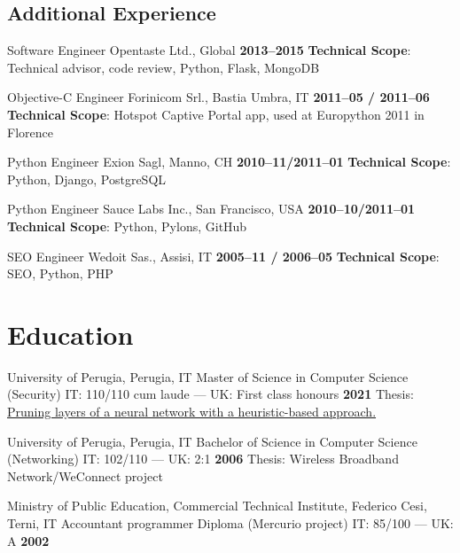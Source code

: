 \documentclass[10pt,a4paper,sans]{moderncv}
\begin{document}
\subsection{Additional Experience}

    {Software Engineer}
    {Opentaste Ltd., Global}
    {\textbf{2013--2015}}
    {\textbf{Technical Scope}: Technical advisor, code review, Python, Flask,
    MongoDB}
    {}

    {Objective-C Engineer}
    {Forinicom Srl., Bastia Umbra, IT}
    {\textbf{2011--05 / 2011--06}}
    {\textbf{Technical Scope}: Hotspot Captive Portal app, used at Europython
    2011 in Florence}
    {}

    {Python Engineer}
    {Exion Sagl, Manno, CH}
    {\textbf{2010--11/2011--01}}
    {\textbf{Technical Scope}: Python, Django, PostgreSQL}
    {}

    {Python Engineer}
    {Sauce Labs Inc., San Francisco, USA}
    {\textbf{2010--10/2011--01}}
    {\textbf{Technical Scope}: Python, Pylons, GitHub}
    {}

    {SEO Engineer}
    {Wedoit Sas., Assisi, IT}
    {\textbf{2005--11 / 2006--05}}
    {\textbf{Technical Scope}: SEO, Python, PHP}
    {}

\section{Education}

\cventry{}
    {University of Perugia, Perugia, IT}
    {Master of Science in Computer Science (Security) IT\@: 110/110 cum laude
        --- UK\@: First class honours}
    {\textbf{2021}}
    {}
    {Thesis: \href{https://github.com/diegorusso/master-degree-thesis}{Pruning
        layers of a neural network with a heuristic-based approach.}}

\cventry{}
    {University of Perugia, Perugia, IT}
    {Bachelor of Science in Computer Science (Networking) IT\@: 102/110 ---
        UK\@: 2:1}
    {\textbf{2006}}
    {}
    {Thesis: Wireless Broadband Network/WeConnect project}

\cventry{}
    {Ministry of Public Education, Commercial Technical Institute, Federico
        Cesi, Terni, IT}
    {Accountant programmer Diploma (Mercurio project) IT\@: 85/100 --- UK\@: A}
    {\textbf{2002}}
    {}
    {}
\end{document}
